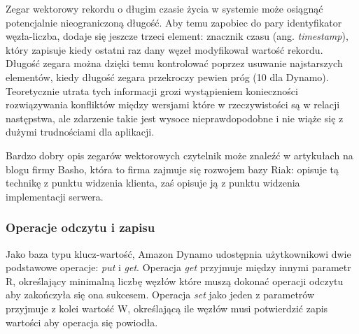 Zegar wektorowy rekordu o długim czasie życia w systemie może osiągnąć potencjalnie nieograniczoną długość.
Aby temu zapobiec do pary identyfikator węzła-liczba, dodaje się jeszcze trzeci element: znacznik czasu (ang. \emph{timestamp}), który zapisuje kiedy ostatni raz dany węzeł modyfikował wartość rekordu.
Długość zegara można dzięki temu kontrolować poprzez usuwanie najstarszych elementów, kiedy długość zegara przekroczy pewien próg (10 dla Dynamo).
Teoretycznie utrata tych informacji grozi wystąpieniem konieczności rozwiązywania konfliktów między wersjami które w rzeczywistości są w relacji następstwa, ale zdarzenie takie jest wysoce nieprawdopodobne i nie wiąże się z dużymi trudnościami dla aplikacji.

Bardzo dobry opis zegarów wektorowych czytelnik może znaleźć w artykułach na blogu firmy Basho, która to firma zajmuje się rozwojem bazy Riak: \cite{basho-vector-clocks-easy} opisuje tą technikę z punktu widzenia klienta, zaś \cite{basho-vector-clocks-hard} opisuje ją z punktu widzenia implementacji serwera.

\subsubsection*{Operacje odczytu i zapisu}

Jako baza typu klucz-wartość, Amazon Dynamo udostępnia użytkownikowi dwie podstawowe operacje: \emph{put} i \emph{get}.
Operacja \emph{get} przyjmuje między innymi parametr R, określający minimalną liczbę węzłów które muszą dokonać operacji odczytu aby zakończyła się ona sukcesem.
Operacja \emph{set} jako jeden z parametrów przyjmuje z kolei wartość W, określającą ile węzłów musi potwierdzić zapis wartości aby operacja się powiodła.

